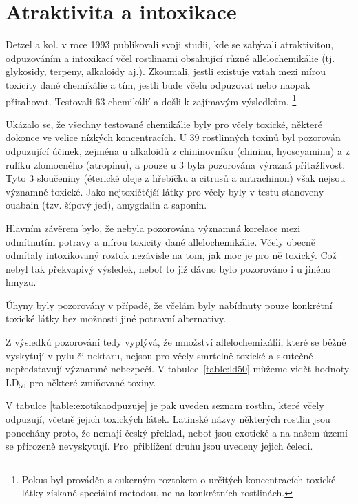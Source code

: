 \documentclass[openany, oneside, a4paper, 12pt, final]{memoir}
\begin{document}
\section{Atraktivita a intoxikace}
Detzel a kol. v roce 1993 \cite{Detzel1993} publikovali svoji studii, kde se zabývali atraktivitou, odpuzováním a intoxikací včel rostlinami obsahující různé allelochemikálie (tj. glykosidy, terpeny, alkaloidy aj.). Zkoumali, jestli existuje vztah mezi mírou toxicity dané chemikálie a tím, jestli bude včelu odpuzovat nebo naopak přitahovat. Testovali 63 chemikálií a došli k zajímavým výsledkům. \footnote{Pokus byl prováděn s cukerným roztokem o určitých koncentracích toxické látky získané speciální metodou, ne na konkrétních rostlinách.}

Ukázalo se, že všechny testované chemikálie byly pro včely toxické, některé dokonce ve velice nízkých koncentracích. U 39 rostlinných toxinů byl pozorován odpuzující účinek, zejména u alkaloidů z chininovníku (chininu, hyoscyaminu) a z rulíku zlomocného (atropinu), a pouze u 3 byla pozorována výrazná přitažlivost. Tyto 3 sloučeniny (éterické oleje z hřebíčku a citrusů a antrachinon) však nejsou významně toxické.
Jako nejtoxičtější látky pro včely byly v testu stanoveny ouabain (tzv. šípový jed), amygdalin a saponin.
 
Hlavním závěrem bylo, že nebyla pozorována významná korelace mezi odmítnutím potravy a mírou toxicity dané allelochemikálie. Včely obecně odmítaly intoxikovaný roztok nezávisle na tom, jak moc je pro ně toxický. Což nebyl tak překvapivý výsledek, neboť to již dávno bylo pozorováno i u jiného hmyzu.

Úhyny byly pozorovány v případě, že včelám byly nabídnuty pouze konkrétní toxické látky bez možnosti jiné potravní alternativy. 

Z výsledků pozorování tedy vyplývá, že množství allelochemikálií, které se běžně vyskytují v pylu či nektaru, nejsou pro včely smrtelně toxické a skutečně nepředstavují významné nebezpečí. V tabulce~\ref{table:ld50} můžeme vidět hodnoty LD$_{50}$ pro některé zmiňované toxiny. \cite{Detzel1993} 

V tabulce \ref{table:exotikaodpuzuje} je pak uveden seznam rostlin, které včely odpuzují, včetně jejich toxických látek. Latinské názvy některých rostlin jsou ponechány proto, že nemají český překlad, neboť jsou exotické a na našem území se přirozeně nevyskytují. Pro~přiblížení druhu jsou uvedeny jejich čeledi. \cite{adler2000ecological}
\end{document}
